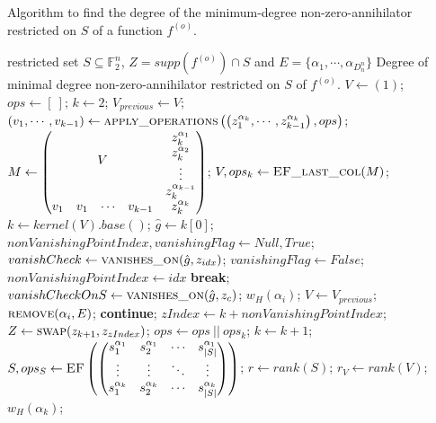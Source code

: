 \documentclass[11pt]{llncs}
\begin{document}
\begin{algorithm}
\small
	\caption{Algorithm to find the degree of the minimum-degree non-zero-annihilator restricted on $S$ of a function $f^{(o)}$.}\label{alg:MinDegreeSnonZeroAnnihilatorIterative}
	\begin{algorithmic}[1]
		\Require restricted set $S\subseteq \mathbb{F}_2^n$, $Z = supp\left(f^{(o)}\right) \cap S$ and $E = \{\alpha_1, \cdots, \alpha_{D_n^n}\}$
		\Ensure Degree of minimal degree non-zero-annihilator restricted on $S$ of $f^{(o)}$.
		\State $V\gets (1)$;
		\State $ops \gets [\ ]$;
		\State $k \gets 2$;
		\State $V_{previous} \gets V$;
		\State $\left(v_1, \cdots, v_{k-1}\right) \gets \mbox{\textsc{apply\_operations}}\left(\left(z_1^{\alpha_k}, \cdots, z_{k-1}^{\alpha_k}\right), ops\right)$\footnotemark;
		\State  $M \gets \begin{pmatrix}
		\multicolumn{4}{c}{\multirow{4}{*}{$V$}} & z_k^{\alpha_1}\\
		& & & & z_k^{\alpha_2}\\
		& & & & \vdots\\
		& & & & z_k^{\alpha_{k-1}}\\
		v_1 & v_1& \cdots & v_{k-1} & z_k^{\alpha_k}
		\end{pmatrix}$;
		\State $V, ops_k\gets \mbox{\textsc{EF\_last\_col}}(M)$\footnotemark;
		\State $k \gets kernel\left(V\right).base()$;
		\State $\hat{g} \gets k[0]$;
		\State $nonVanishingPointIndex, vanishingFlag \gets Null, True$;
		\State $vanishCheck \gets \mbox{\textsc{vanishes\_on}}(\hat{g}, z_{idx})$\footnotemark;
		\State $vanishingFlag \gets False$;
        \State $nonVanishingPointIndex \gets idx$
		\State \textbf{break};
		\EndIf
        \EndFor
		\State $vanishCheckOnS \gets \mbox{\textsc{vanishes\_on}}(\hat{g}, z_c)$;
		\State \Return $w_H\left(\alpha_i\right)$;
		\EndIf
		\EndFor
		\State $V\gets V_{previous}$;
		\State $\mbox{\textsc{remove}}(\alpha_i, E)$; 
		\State \textbf{continue}; 
        \Else
		\State $zIndex \gets k+nonVanishingPointIndex$;
		\State $Z \gets \mbox{\textsc{swap}}(z_{k+1}, z_{zIndex})$\footnotemark;
		\EndIf
        \State $ops\gets ops\ ||\ ops_k$;
		\State $k\gets k+1$;
		\EndIf
		\EndWhile
        \State $S, ops_S \gets \mbox{\textsc{EF}}\left(
		\begin{pmatrix}
		s_1^{\alpha_1} &  s_2^{\alpha_1} & \cdots & s_{|S|}^{\alpha_{1}}\\
		\vdots &  \vdots & \ddots & \vdots\\
		s_{1}^{\alpha_k} &  s_{2}^{\alpha_k} & \cdots & s_{|S|}^{\alpha_{k}}\\
		\end{pmatrix}\right)$;
		\State $r \gets rank(S)$;
        \State $r_V \gets rank(V)$;
		\State \Return $w_H\left(\alpha_k\right)$;
		\EndIf
		\State {}
	\end{algorithmic}
\end{algorithm}
\end{document}
